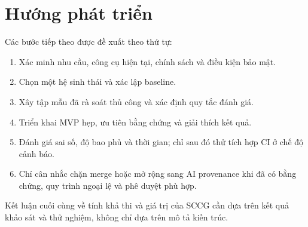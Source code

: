 \section{Hướng phát triển}
Các bước tiếp theo được đề xuất theo thứ tự:
\begin{enumerate}[label=\arabic*.]
    \item Xác minh nhu cầu, công cụ hiện tại, chính sách và điều kiện bảo mật.
    \item Chọn một hệ sinh thái và xác lập baseline.
    \item Xây tập mẫu đã rà soát thủ công và xác định quy tắc đánh giá.
    \item Triển khai MVP hẹp, ưu tiên bằng chứng và giải thích kết quả.
    \item Đánh giá sai số, độ bao phủ và thời gian; chỉ sau đó thử tích hợp CI ở chế độ cảnh báo.
    \item Chỉ cân nhắc chặn merge hoặc mở rộng sang AI provenance khi đã có bằng chứng, quy trình ngoại lệ và phê duyệt phù hợp.
\end{enumerate}

Kết luận cuối cùng về tính khả thi và giá trị của SCCG cần dựa trên kết quả khảo sát và thử nghiệm, không chỉ dựa trên mô tả kiến trúc.
